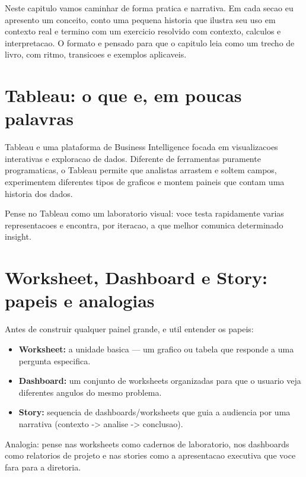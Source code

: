 Neste capitulo vamos caminhar de forma pratica e narrativa. Em cada secao eu apresento um conceito, conto uma pequena historia que ilustra seu uso em contexto real e termino com um exercicio resolvido com contexto, calculos e interpretacao. O formato e pensado para que o capitulo leia como um trecho de livro, com ritmo, transicoes e exemplos aplicaveis.

\section{Tableau: o que e, em poucas palavras}

Tableau e uma plataforma de Business Intelligence focada em visualizacoes interativas e exploracao de dados. Diferente de ferramentas puramente programaticas, o Tableau permite que analistas arrastem e soltem campos, experimentem diferentes tipos de graficos e montem paineis que contam uma historia dos dados.

Pense no Tableau como um laboratorio visual: voce testa rapidamente varias representacoes e encontra, por iteracao, a que melhor comunica determinado insight.

\section{Worksheet, Dashboard e Story: papeis e analogias}

Antes de construir qualquer painel grande, e util entender os papeis:
\begin{itemize}
  \item \textbf{Worksheet:} a unidade basica — um grafico ou tabela que responde a uma pergunta especifica.
  \item \textbf{Dashboard:} um conjunto de worksheets organizadas para que o usuario veja diferentes angulos do mesmo problema.
  \item \textbf{Story:} sequencia de dashboards/worksheets que guia a audiencia por uma narrativa (contexto -> analise -> conclusao).
\end{itemize}

Analogia: pense nas worksheets como cadernos de laboratorio, nos dashboards como relatorios de projeto e nas stories como a apresentacao executiva que voce fara para a diretoria.

